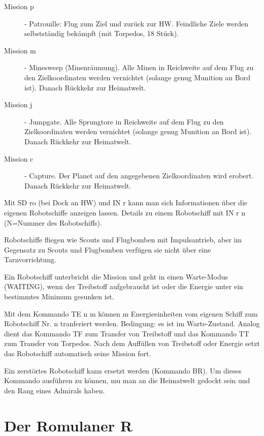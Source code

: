 \begin{description}
\item [Mission p] -  Patrouille: Flug zum Ziel und zur\"uck zur HW. Feindliche
Ziele werden selbstst\"andig bek\"ampft (mit Torpedos, 18 St\"uck).

\item [Mission m] - Minesweep (Minenr\"aumung). Alle Minen in 
Reichweite auf dem Flug
zu den Zielkoordinaten werden vernichtet (solange genug Munition an Bord ist).
Danach R\"uckkehr zur Heimatwelt.

\item [Mission j] - Jumpgate. Alle Sprungtore in 
Reichweite auf dem Flug
zu den Zielkoordinaten werden vernichtet (solange genug Munition an Bord ist).
Danach R\"uckkehr zur Heimatwelt.

\item [Mission c] - Capture. Der Planet auf den angegebenen Zielkoordinaten 
wird erobert. Danach R\"uckkehr zur Heimatwelt.


\end{description}

Mit SD ro (bei Dock an HW) und IN r kann man sich Informationen \"uber 
die eigenen Robotschiffe anzeigen lassen. Details zu einem Robotschiff mit
IN r n (N=Nummer des Robotschiffs).

Robotschiffe fliegen wie Scouts und Flugbomben mit Impulsantrieb, aber im
Gegensatz zu Scouts und Flugbomben verf\"ugen sie nicht \"uber eine 
Tarnvorrichtung.

Ein Robotschiff unterbricht die Mission und geht in einen Warte-Modus
(WAITING), wenn der Treibstoff aufgebraucht ist oder die Energie unter ein
bestimmtes Minimum gesunken ist.

Mit dem Kommando TE n m k\"onnen m Energieeinheiten vom eigenen Schiff zum
Robotschiff Nr. n tranferiert werden. Bedingung: es ist im Warte-Zustand.
Analog dient das Kommando TF zum Transfer von Treibstoff und das Kommando
TT zum Transfer von Torpedos. Nach dem Auff\"ullen von Treibstoff oder Energie
setzt das Robotschiff automatisch seine Mission fort.

Ein zerst\"ortes Robotschiff kann ersetzt werden (Kommando BR). Um dieses
Kommando ausf\"uhren zu k\"onnen, mu\3 man an die Heimatwelt gedockt sein
und den Rang eines Admirals haben.

\section{Der Romulaner R}

